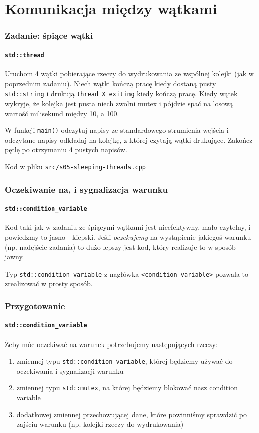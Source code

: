 \documentclass[aspectratio=169]{beamer}
\begin{document}
\section{Komunikacja między wątkami}

\begin{frame}[fragile]
    \frametitle{Zadanie: śpiące wątki}
    \framesubtitle{\texttt{std::thread}}
    \label{lecture_exercise_3}

    {\small
    Uruchom 4 wątki pobierające rzeczy do wydrukowania ze wspólnej kolejki (jak
    w poprzednim zadaniu). Niech wątki kończą pracę kiedy dostaną pusty
    \texttt{std::string} i drukują \texttt{thread X exiting} kiedy kończą pracę.
    Kiedy wątek wykryje, że kolejka jest pusta niech zwolni mutex i pójdzie spać
    na losową wartość milisekund między 10, a 100.

    \vspace{1em}

    W funkcji \texttt{main()} odczytuj napisy ze standardowego strumienia
    wejścia i odczytane napisy odkładaj na kolejkę, z której czytają wątki
    drukujące.
    Zakończ pętlę po otrzymaniu 4 pustych napisów.

    \vspace{1em}

    Kod w pliku \texttt{src/s05-sleeping-threads.cpp}}
\end{frame}

\begin{frame}
    \frametitle{Oczekiwanie na, i sygnalizacja warunku}
    \framesubtitle{\texttt{std::condition\_variable}}

    Kod taki jak w zadaniu ze śpiącymi wątkami jest nieefektywny, mało
    czytelny, i - powiedzmy to jasno - kiepski. Jeśli \emph{oczekujemy} na
    wystąpienie jakiegoś warunku (np. nadejście zadania) to dużo lepszy jest
    kod, który realizuje to w sposób jawny.

    \vspace{1em}

    Typ \texttt{std::condition\_variable} z nagłówka
    \texttt{<condition\_variable>} pozwala to zrealizować w prosty sposób.
\end{frame}

\begin{frame}
    \frametitle{Przygotowanie}
    \framesubtitle{\texttt{std::condition\_variable}}

    Żeby móc oczekiwać na warunek potrzebujemy następujących rzeczy:
    \begin{enumerate}
        \item zmiennej typu \texttt{std::condition\_variable}, której będziemy
            używać do oczekiwania i sygnalizacji warunku
        \item zmiennej typu \texttt{std::mutex}, na której będziemy blokować
            nasz condition variable
        \item dodatkowej zmiennej przechowującej dane, które
            powinniśmy sprawdzić po zajściu warunku (np. kolejki rzeczy do
            wydrukowania)
    \end{enumerate}
\end{frame}
\end{document}
